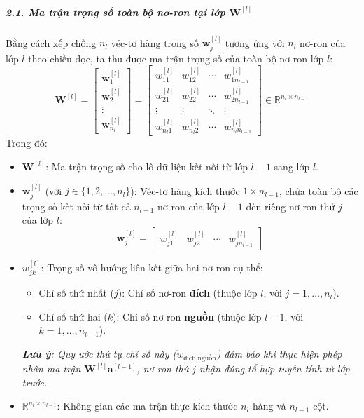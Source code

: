 \subparagraph{2.1. Ma trận trọng số toàn bộ nơ-ron tại lớp $\mathbf{W}^{[l]}$\\}
Bằng cách xếp chồng $n_l$ véc-tơ hàng trọng số $\mathbf{w}_j^{[l]}$ tương ứng với $n_l$ nơ-ron của lớp $l$ theo chiều dọc, ta thu được ma trận trọng số của toàn bộ nơ-ron lớp $l$:
\begin{equation}
\mathbf{W}^{[l]} = \begin{bmatrix} 
    \mathbf{w}_1^{[l]} \\[4pt] 
    \mathbf{w}_2^{[l]} \\[4pt] 
    \vdots \\[4pt] 
    \mathbf{w}_{n_l}^{[l]} 
\end{bmatrix} = \begin{bmatrix} 
    w_{11}^{[l]} & w_{12}^{[l]} & \cdots & w_{1 n_{l-1}}^{[l]} \\ 
    w_{21}^{[l]} & w_{22}^{[l]} & \cdots & w_{2 n_{l-1}}^{[l]} \\ 
    \vdots & \vdots & \ddots & \vdots \\ 
    w_{n_l 1}^{[l]} & w_{n_l 2}^{[l]} & \cdots & w_{n_l n_{l-1}}^{[l]} 
\end{bmatrix} \in \mathbb{R}^{n_l \times n_{l-1}}
\label{eq:ma_tran_trong_so}
\end{equation}
Trong đó:
\begin{itemize}
    \item $\mathbf{W}^{[l]}$: Ma trận trọng số cho lô dữ liệu kết nối từ lớp $l-1$ sang lớp $l$.

    \item $\mathbf{w}_j^{[l]}$ (với $j \in \{1, 2, \dots, n_l\}$): Véc-tơ hàng kích thước $1 \times n_{l-1}$, chứa toàn bộ các trọng số kết nối từ tất cả $n_{l-1}$ nơ-ron của lớp $l-1$ đến riêng nơ-ron thứ $j$ của lớp $l$:
    \[
    \mathbf{w}_j^{[l]} = \begin{bmatrix} w_{j1}^{[l]} & w_{j2}^{[l]} & \cdots & w_{j n_{l-1}}^{[l]} \end{bmatrix}
    \]

    \item $w_{jk}^{[l]}$: Trọng số vô hướng liên kết giữa hai nơ-ron cụ thể:
    \begin{itemize}
        \item Chỉ số thứ nhất ($j$): Chỉ số nơ-ron \textbf{đích} (thuộc lớp $l$, với $j = 1, \dots, n_l$).
        \item Chỉ số thứ hai ($k$): Chỉ số nơ-ron \textbf{nguồn} (thuộc lớp $l-1$, với $k = 1, \dots, n_{l-1}$).
    \end{itemize}
    \emph{\textbf{Lưu ý}: Quy ước thứ tự chỉ số này ($w_{\text{đích}, \text{nguồn}}$) đảm bảo khi thực hiện phép nhân ma trận $\mathbf{W}^{[l]} \mathbf{a}^{[l-1]}$, nơ-ron thứ $j$ nhận đúng tổ hợp tuyến tính từ lớp trước.}

    \item $\mathbb{R}^{n_l \times n_{l-1}}$: Không gian các ma trận thực kích thước $n_l$ hàng và $n_{l-1}$ cột.
\end{itemize}

